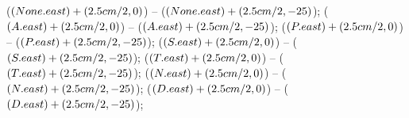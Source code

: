  ($(None.east)+(2.5cm / 2,0)$) -- ($(None.east)+(2.5cm / 2,-25)$);
 ($(A.east)+(2.5cm / 2,0)$) -- ($(A.east)+(2.5cm / 2,-25)$);
 ($(P.east)+(2.5cm / 2 ,0)$) -- ($(P.east)+(2.5cm / 2 ,-25)$);
 ($(S.east)+(2.5cm / 2 ,0)$) -- ($(S.east)+(2.5cm / 2 ,-25)$);
 ($(T.east)+(2.5cm / 2 ,0)$) -- ($(T.east)+(2.5cm / 2,-25)$);
 ($(N.east)+(2.5cm / 2 ,0)$) -- ($(N.east)+(2.5cm / 2,-25)$);
 ($(D.east)+(2.5cm / 2 ,0)$) -- ($(D.east)+(2.5cm / 2,-25)$);